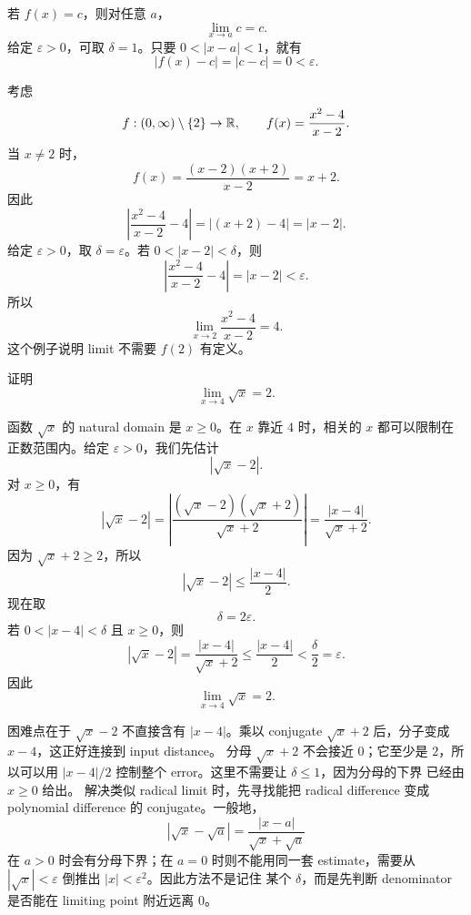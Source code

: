 \begin{example}
若 \(f(x)=c\)，则对任意 \(a\)，
\[
  \lim_{x\to a}c=c.
\]
给定 \(\varepsilon>0\)，可取 \(\delta=1\)。只要
\(0<|x-a|<1\)，就有
\[
  |f(x)-c|=|c-c|=0<\varepsilon.
\]
\end{example}

\begin{example}
考虑
\[
  f:(0,\infty)\setminus\{2\}\to\mathbb{R},\qquad
  f(x)=\frac{x^2-4}{x-2}.
\]
当 \(x\neq2\) 时，
\[
  f(x)=\frac{(x-2)(x+2)}{x-2}=x+2.
\]
因此
\[
  \left|\frac{x^2-4}{x-2}-4\right|
  =
  |(x+2)-4|
  =
  |x-2|.
\]
给定 \(\varepsilon>0\)，取 \(\delta=\varepsilon\)。若
\(0<|x-2|<\delta\)，则
\[
  \left|\frac{x^2-4}{x-2}-4\right|
  =
  |x-2|
  <
  \varepsilon.
\]
所以
\[
  \lim_{x\to2}\frac{x^2-4}{x-2}=4.
\]
这个例子说明 limit 不需要 \(f(2)\) 有定义。
\end{example}

\begin{exerciseblock}
证明
\[
  \lim_{x\to4}\sqrt{x}=2.
\]
\end{exerciseblock}

\begin{solution}
函数 \(\sqrt{x}\) 的 natural domain 是 \(x\geq0\)。在 \(x\) 靠近 \(4\)
时，相关的 \(x\) 都可以限制在正数范围内。给定 \(\varepsilon>0\)，我们先估计
\[
  |\sqrt{x}-2|.
\]
对 \(x\geq0\)，有
\[
  |\sqrt{x}-2|
  =
  \left|\frac{(\sqrt{x}-2)(\sqrt{x}+2)}{\sqrt{x}+2}\right|
  =
  \frac{|x-4|}{\sqrt{x}+2}.
\]
因为 \(\sqrt{x}+2\geq2\)，所以
\[
  |\sqrt{x}-2|
  \leq
  \frac{|x-4|}{2}.
\]
现在取
\[
  \delta=2\varepsilon.
\]
若 \(0<|x-4|<\delta\) 且 \(x\geq0\)，则
\[
  |\sqrt{x}-2|
  =
  \frac{|x-4|}{\sqrt{x}+2}
  \leq
  \frac{|x-4|}{2}
  <
  \frac{\delta}{2}
  =
  \varepsilon.
\]
因此
\[
  \lim_{x\to4}\sqrt{x}=2.
\]
\end{solution}

\begin{explanation}
困难点在于 \(\sqrt{x}-2\) 不直接含有 \(|x-4|\)。乘以 conjugate
\(\sqrt{x}+2\) 后，分子变成 \(x-4\)，这正好连接到 input distance。
分母 \(\sqrt{x}+2\) 不会接近 \(0\)；它至少是 \(2\)，所以可以用
\(|x-4|/2\) 控制整个 error。这里不需要让 \(\delta\leq1\)，因为分母的下界
已经由 \(x\geq0\) 给出。
解决类似 radical limit 时，先寻找能把 radical difference 变成 polynomial
difference 的 conjugate。一般地，
\[
  |\sqrt{x}-\sqrt{a}|=\frac{|x-a|}{\sqrt{x}+\sqrt{a}}
\]
在 \(a>0\) 时会有分母下界；在 \(a=0\) 时则不能用同一套 estimate，需要从
\(|\sqrt{x}|<\varepsilon\) 倒推出 \(|x|<\varepsilon^2\)。因此方法不是记住
某个 \(\delta\)，而是先判断 denominator 是否能在 limiting point 附近远离
\(0\)。
\end{explanation}

